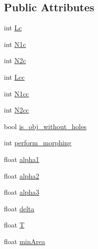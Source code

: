 \subsection*{Public Attributes}
\begin{DoxyCompactItemize}
\item 
int \hyperlink{structcv_1_1gpu_1_1FGDStatModel_1_1Params_a859698b36c00550ec238f317d9660286}{Lc}
\item 
int \hyperlink{structcv_1_1gpu_1_1FGDStatModel_1_1Params_a957ca619e785188c7b390c8b5faefdc4}{N1c}
\item 
int \hyperlink{structcv_1_1gpu_1_1FGDStatModel_1_1Params_a33685186c1bfb25d854a1e1e14fc2ad3}{N2c}
\item 
int \hyperlink{structcv_1_1gpu_1_1FGDStatModel_1_1Params_afab9c00a68b21ed3c4dafebd23c60547}{Lcc}
\item 
int \hyperlink{structcv_1_1gpu_1_1FGDStatModel_1_1Params_ac20ee9490221abb9268f7b713942ed44}{N1cc}
\item 
int \hyperlink{structcv_1_1gpu_1_1FGDStatModel_1_1Params_a4312dc7d29e659c844c7fee0162fa070}{N2cc}
\item 
bool \hyperlink{structcv_1_1gpu_1_1FGDStatModel_1_1Params_adadf53794d6aa8a151f68ff0b6840fba}{is\-\_\-obj\-\_\-without\-\_\-holes}
\item 
int \hyperlink{structcv_1_1gpu_1_1FGDStatModel_1_1Params_a0f0a1c9ddd3b66d1b3a4aa10826dd0a7}{perform\-\_\-morphing}
\item 
float \hyperlink{structcv_1_1gpu_1_1FGDStatModel_1_1Params_a088911ceee79da8523bb8d489df8fe3c}{alpha1}
\item 
float \hyperlink{structcv_1_1gpu_1_1FGDStatModel_1_1Params_a90895cf2429972c84546aad28462dcc9}{alpha2}
\item 
float \hyperlink{structcv_1_1gpu_1_1FGDStatModel_1_1Params_a2a2b8887693ccff22e63725f36ed84a2}{alpha3}
\item 
float \hyperlink{structcv_1_1gpu_1_1FGDStatModel_1_1Params_a6427682d26a608b924e96928139b3d17}{delta}
\item 
float \hyperlink{structcv_1_1gpu_1_1FGDStatModel_1_1Params_a16c905f2d50f44f6ccf5c62efc1bfb64}{T}
\item 
float \hyperlink{structcv_1_1gpu_1_1FGDStatModel_1_1Params_aa640a266a42d7ad172c3abf6518cb8f7}{min\-Area}
\end{DoxyCompactItemize}


